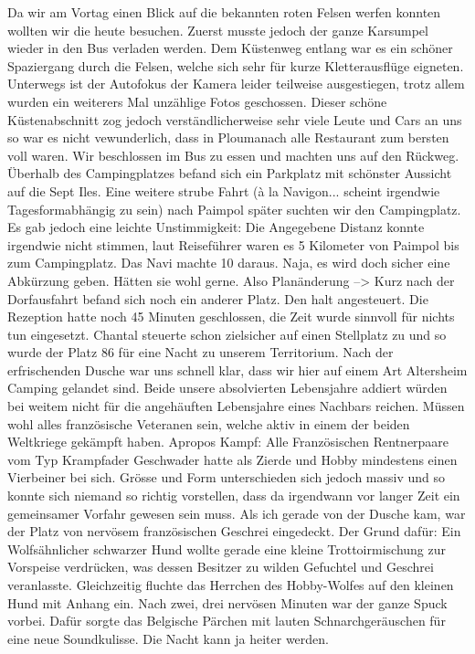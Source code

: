 Da wir am Vortag einen Blick auf die bekannten roten Felsen werfen konnten wollten wir die heute besuchen.
Zuerst musste jedoch der ganze Karsumpel wieder in den Bus verladen werden.
Dem Küstenweg entlang war es ein schöner Spaziergang durch die Felsen, welche sich sehr für kurze Kletterausflüge eigneten.
Unterwegs ist der Autofokus der Kamera leider teilweise ausgestiegen, trotz allem wurden ein weiterers Mal unzählige Fotos geschossen.
Dieser schöne Küstenabschnitt zog jedoch verständlicherweise sehr viele Leute und Cars an uns so war es nicht vewunderlich, dass in Ploumanach alle Restaurant zum bersten voll waren.
Wir beschlossen im Bus zu essen und machten uns auf den Rückweg.
Überhalb des Campingplatzes befand sich ein Parkplatz mit schönster Aussicht auf die Sept Iles.
Eine weitere strube Fahrt (\`a la Navigon... scheint irgendwie Tagesformabhängig zu sein) nach Paimpol später suchten wir den Campingplatz.
Es gab jedoch eine leichte Unstimmigkeit: Die Angegebene Distanz konnte irgendwie nicht stimmen, laut Reiseführer waren es 5 Kilometer von Paimpol bis zum Campingplatz.
Das Navi machte 10 daraus.
Naja, es wird doch sicher eine Abkürzung geben. 
Hätten sie wohl gerne.
Also Planänderung --> Kurz nach der Dorfausfahrt befand sich noch ein anderer Platz.
Den halt angesteuert.
Die Rezeption hatte noch 45 Minuten geschlossen, die Zeit wurde sinnvoll für nichts tun eingesetzt.
Chantal steuerte schon zielsicher auf einen Stellplatz zu und so wurde der Platz 86 für eine Nacht zu unserem Territorium.
Nach der erfrischenden Dusche war uns schnell klar, dass wir hier auf einem Art Altersheim Camping gelandet sind.
Beide unsere absolvierten Lebensjahre addiert würden bei weitem nicht für die angehäuften Lebensjahre eines Nachbars reichen.
Müssen wohl alles französische Veteranen sein, welche aktiv in einem der beiden Weltkriege gekämpft haben.
Apropos Kampf: Alle Französischen Rentnerpaare vom Typ Krampfader Geschwader hatte als Zierde und Hobby mindestens einen Vierbeiner bei sich.
Grösse und Form unterschieden sich jedoch massiv und so konnte sich niemand so richtig vorstellen, dass da irgendwann vor langer Zeit ein gemeinsamer Vorfahr gewesen sein muss.
Als ich gerade von der Dusche kam, war der Platz von nervösem französischen Geschrei eingedeckt.
Der Grund dafür: Ein Wolfsähnlicher schwarzer Hund wollte gerade eine kleine Trottoirmischung zur Vorspeise verdrücken, was dessen Besitzer zu wilden Gefuchtel und Geschrei veranlasste.
Gleichzeitig fluchte das Herrchen des Hobby-Wolfes auf den kleinen Hund mit Anhang ein.
Nach zwei, drei nervösen Minuten war der ganze Spuck vorbei.
Dafür sorgte das Belgische Pärchen mit lauten Schnarchgeräuschen für eine neue Soundkulisse.
Die Nacht kann ja heiter werden.

